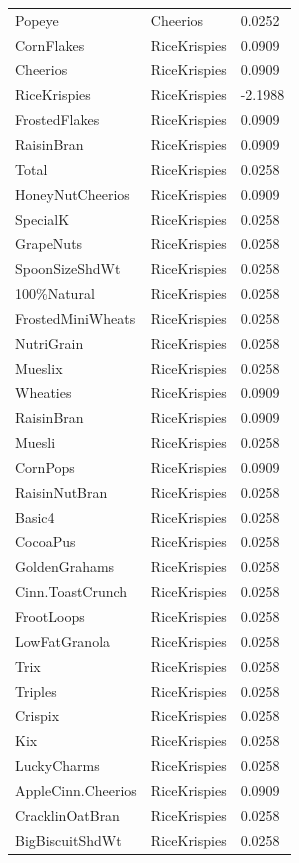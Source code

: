 \begin{table}[!htbp]
\begin{tabular}{lll}
Popeye & Cheerios & 0.0252
\\
CornFlakes & RiceKrispies & 0.0909
\\
Cheerios & RiceKrispies & 0.0909
\\
RiceKrispies & RiceKrispies & -2.1988
\\
FrostedFlakes & RiceKrispies & 0.0909
\\
RaisinBran & RiceKrispies & 0.0909
\\
Total & RiceKrispies & 0.0258
\\
HoneyNutCheerios & RiceKrispies & 0.0909
\\
SpecialK & RiceKrispies & 0.0258
\\
GrapeNuts & RiceKrispies & 0.0258
\\
SpoonSizeShdWt & RiceKrispies & 0.0258
\\
100\%Natural & RiceKrispies & 0.0258
\\
FrostedMiniWheats & RiceKrispies & 0.0258
\\
NutriGrain & RiceKrispies & 0.0258
\\
Mueslix & RiceKrispies & 0.0258
\\
Wheaties & RiceKrispies & 0.0909
\\
RaisinBran & RiceKrispies & 0.0909
\\
Muesli & RiceKrispies & 0.0258
\\
CornPops & RiceKrispies & 0.0909
\\
RaisinNutBran & RiceKrispies & 0.0258
\\
Basic4 & RiceKrispies & 0.0258
\\
CocoaPus & RiceKrispies & 0.0258
\\
GoldenGrahams & RiceKrispies & 0.0258
\\
Cinn.ToastCrunch & RiceKrispies & 0.0258
\\
FrootLoops & RiceKrispies & 0.0258
\\
LowFatGranola & RiceKrispies & 0.0258
\\
Trix & RiceKrispies & 0.0258
\\
Triples & RiceKrispies & 0.0258
\\
Crispix & RiceKrispies & 0.0258
\\
Kix & RiceKrispies & 0.0258
\\
LuckyCharms & RiceKrispies & 0.0258
\\
AppleCinn.Cheerios & RiceKrispies & 0.0909
\\
CracklinOatBran & RiceKrispies & 0.0258
\\
BigBiscuitShdWt & RiceKrispies & 0.0258

\end{tabular}
\end{table}

